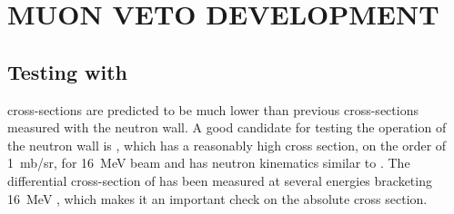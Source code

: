 %
%
%
%
%
%
%
%

%
%

\chapter{MUON VETO DEVELOPMENT}
\label{chap:muVeto}

\section{Testing with \MgReaction}

\reaction cross-sections are predicted to be much lower than previous cross-sections measured with the neutron wall.  A good candidate for testing the operation of the neutron wall is \MgReaction, which has a reasonably high cross section, on the order of 1~mb/sr, for 16~MeV  beam and has neutron kinematics similar to \reaction.  The differential cross-section of \MgReaction has been measured at several energies bracketing 16~MeV \cite{Bohne_Mg, MgCrossSection1}, which makes it an important check on the \reaction absolute cross section.  

